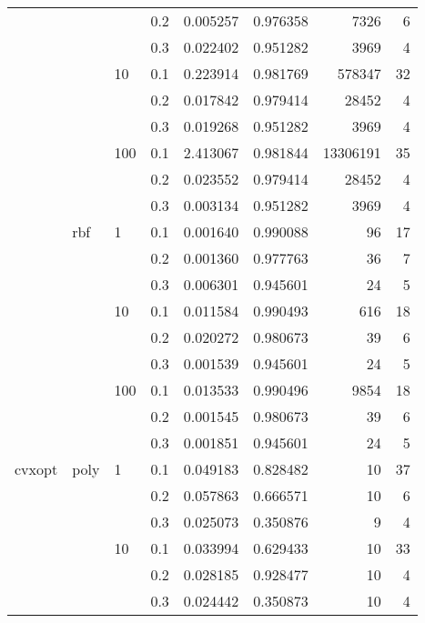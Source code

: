\begin{table}[H]
\begin{tabular}{llllrrrr}
       &     &     & 0.2 &     0.005257 &  0.976358 &      7326 &     6 \\
       &     &     & 0.3 &     0.022402 &  0.951282 &      3969 &     4 \\
       &     & 10  & 0.1 &     0.223914 &  0.981769 &    578347 &    32 \\
       &     &     & 0.2 &     0.017842 &  0.979414 &     28452 &     4 \\
       &     &     & 0.3 &     0.019268 &  0.951282 &      3969 &     4 \\
       &     & 100 & 0.1 &     2.413067 &  0.981844 &  13306191 &    35 \\
       &     &     & 0.2 &     0.023552 &  0.979414 &     28452 &     4 \\
       &     &     & 0.3 &     0.003134 &  0.951282 &      3969 &     4 \\
       & rbf & 1   & 0.1 &     0.001640 &  0.990088 &        96 &    17 \\
       &     &     & 0.2 &     0.001360 &  0.977763 &        36 &     7 \\
       &     &     & 0.3 &     0.006301 &  0.945601 &        24 &     5 \\
       &     & 10  & 0.1 &     0.011584 &  0.990493 &       616 &    18 \\
       &     &     & 0.2 &     0.020272 &  0.980673 &        39 &     6 \\
       &     &     & 0.3 &     0.001539 &  0.945601 &        24 &     5 \\
       &     & 100 & 0.1 &     0.013533 &  0.990496 &      9854 &    18 \\
       &     &     & 0.2 &     0.001545 &  0.980673 &        39 &     6 \\
       &     &     & 0.3 &     0.001851 &  0.945601 &        24 &     5 \\
cvxopt & poly & 1   & 0.1 &     0.049183 &  0.828482 &        10 &    37 \\
       &     &     & 0.2 &     0.057863 &  0.666571 &        10 &     6 \\
       &     &     & 0.3 &     0.025073 &  0.350876 &         9 &     4 \\
       &     & 10  & 0.1 &     0.033994 &  0.629433 &        10 &    33 \\
       &     &     & 0.2 &     0.028185 &  0.928477 &        10 &     4 \\
       &     &     & 0.3 &     0.024442 &  0.350873 &        10 &     4 \\

\end{tabular}
\end{table}
